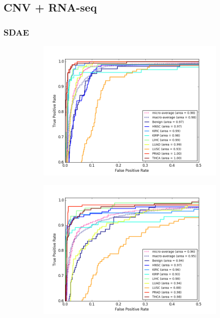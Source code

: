 \subsection{CNV + RNA-seq}\label{sub:c_r_results}

\subsubsection{SDAE}

\begin{figure}[H]
     \centering
     \begin{subfigure}[b]{0.49\textwidth}
         \centering
         \includegraphics[width=\textwidth]{img/m_r/m_r_sdae_dgmu_roc.png}
         \caption{}
     \end{subfigure}
     \hfill
     \begin{subfigure}[b]{0.49\textwidth}
         \centering
         \includegraphics[width=\textwidth]{img/m_r/m_r_sdae_gmu_roc.png}

\end{subfigure}
\end{figure}
